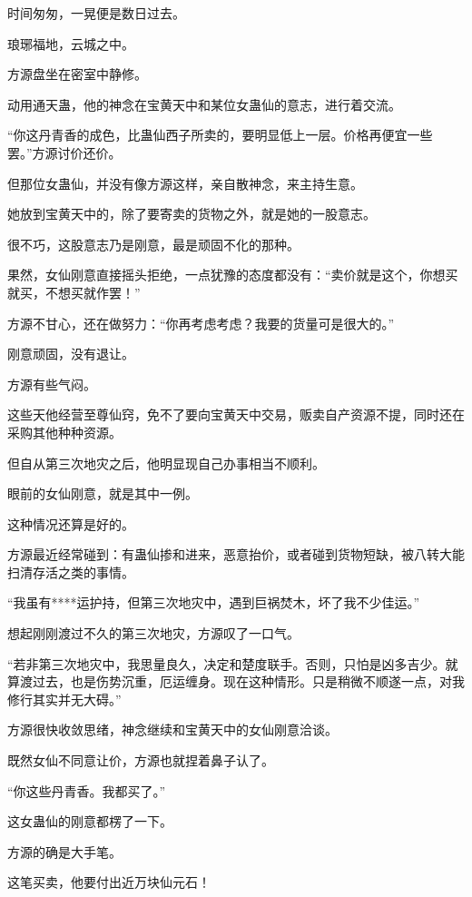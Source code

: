 
\begin{this_body}

时间匆匆，一晃便是数日过去。

琅琊福地，云城之中。

方源盘坐在密室中静修。

动用通天蛊，他的神念在宝黄天中和某位女蛊仙的意志，进行着交流。

“你这丹青香的成色，比蛊仙西子所卖的，要明显低上一层。价格再便宜一些罢。”方源讨价还价。

但那位女蛊仙，并没有像方源这样，亲自散神念，来主持生意。

她放到宝黄天中的，除了要寄卖的货物之外，就是她的一股意志。

很不巧，这股意志乃是刚意，最是顽固不化的那种。

果然，女仙刚意直接摇头拒绝，一点犹豫的态度都没有：“卖价就是这个，你想买就买，不想买就作罢！”

方源不甘心，还在做努力：“你再考虑考虑？我要的货量可是很大的。”

刚意顽固，没有退让。

方源有些气闷。

这些天他经营至尊仙窍，免不了要向宝黄天中交易，贩卖自产资源不提，同时还在采购其他种种资源。

但自从第三次地灾之后，他明显现自己办事相当不顺利。

眼前的女仙刚意，就是其中一例。

这种情况还算是好的。

方源最近经常碰到：有蛊仙掺和进来，恶意抬价，或者碰到货物短缺，被八转大能扫清存活之类的事情。

“我虽有****运护持，但第三次地灾中，遇到巨祸焚木，坏了我不少佳运。”

想起刚刚渡过不久的第三次地灾，方源叹了一口气。

“若非第三次地灾中，我思量良久，决定和楚度联手。否则，只怕是凶多吉少。就算渡过去，也是伤势沉重，厄运缠身。现在这种情形。只是稍微不顺遂一点，对我修行其实并无大碍。”

方源很快收敛思绪，神念继续和宝黄天中的女仙刚意洽谈。

既然女仙不同意让价，方源也就捏着鼻子认了。

“你这些丹青香。我都买了。”

这女蛊仙的刚意都楞了一下。

方源的确是大手笔。

这笔买卖，他要付出近万块仙元石！


\end{this_body}
